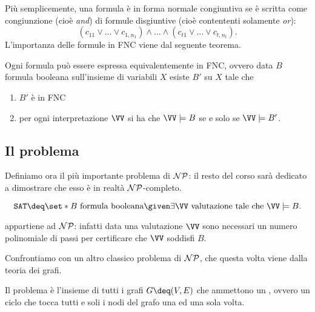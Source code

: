 Più semplicemente, una formula è in forma normale congiuntiva se è scritta come
congiunzione (cioè \emph{and}) di formule disgiuntive (cioè contententi
solamente \emph{or}): \[
    (c_{11} \lor \dots \lor c_{1,n_1}) \land \dots \land 
    (c_{t1} \lor \dots \lor c_{t,n_t}).
\]
L'importanza delle formule in FNC viene dal seguente teorema.
\begin{theorem}
  Ogni formula può essere espressa equivalentemente in FNC, ovvero data $B$ 
  formula booleana sull'insieme di variabili $X$ esiste $B'$ su $X$ tale che 
  \begin{enumerate}
    \item $B'$ è in FNC
    \item per ogni interpretazione $\VV$ si ha che $\VV \models B$ 
    se e solo se $\VV \models B'$.  
  \end{enumerate}    
\end{theorem}

\subsection{Il problema \SAT}

Definiamo ora il più importante problema di $\mathcal{NP}$: il resto del corso
sarà dedicato a dimostrare che esso è in realtà $\mathcal{NP}$-completo.

\begin{definition}
  \[
      \SAT \deq \set*{B \text{ formula booleana} 
        \given \exists \VV \text{ valutazione tale che } \VV \models B}.
  \]
\end{definition}

\SAT{} appartiene ad $\mathcal{NP}$: infatti data una valutazione $\VV$ sono necessari
un numero polinomiale di passi per certificare che $\VV$ soddisfi $B$.

Confrontiamo \SAT{} con un altro classico problema di $\mathcal{NP}$, che questa volta
viene dalla teoria dei grafi.

\begin{definition}
  Il problema \HAM{} è l'insieme di tutti i grafi $G \deq (V, E)$ che ammettono
  un , ovvero un ciclo che tocca tutti e soli i nodi
  del grafo una ed una sola volta. 
\end{definition}

